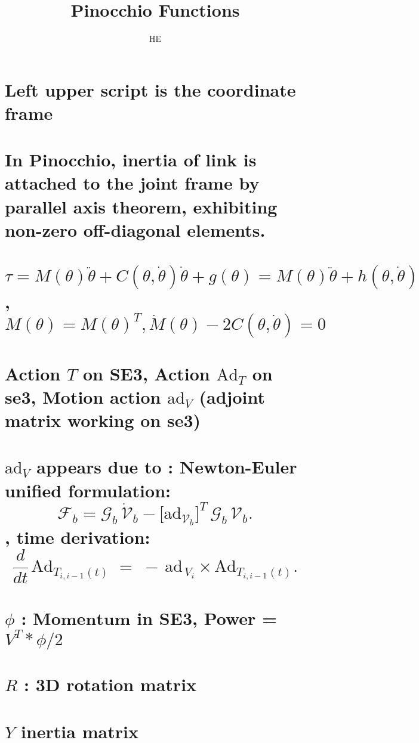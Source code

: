 \documentclass[10pt]{article}
\begin{document}
\title{Pinocchio Functions}
\author{HE}
\date{}
\maketitle

\section*{Left upper script is the coordinate frame}
\section*{In Pinocchio, inertia of link is attached to the joint frame by parallel axis theorem, exhibiting non-zero off-diagonal elements.}

\section*{$\tau = M(\theta) \ddot{\theta}+C(\theta,\dot{\theta})\dot{\theta} + g(\theta) = M(\theta) \ddot{\theta} + h(\theta,\dot{\theta})$
, $M(\theta) = M(\theta)^T, \dot{M}(\theta)-2C(\theta,\dot{\theta}) = 0$}


\section*{Action $T$ on SE3, 
Action  $\text{Ad}_T$ on se3, 
Motion action $\text{ad}_V$ (adjoint matrix working on se3)}
\section*{$\text{ad}_V$ appears due to : Newton-Euler unified formulation:
\[
\mathcal{F}_b 
= 
\mathcal{G}_b\,\dot{\mathcal{V}}_b
-
\bigl[\mathrm{ad}_{\mathcal{V}_b}\bigr]^{T}\,\mathcal{G}_b\,\mathcal{V}_b.
\]
, time derivation: \[
\frac{d}{dt} \,\mathrm{Ad}_{T_{i,i-1}(t)} 
\;=\;
-\,\mathrm{ad}_{\,V_{i}} \times \mathrm{Ad}_{T_{i,i-1}(t)}.
\]}
\section*{$\phi$ : $\boldsymbol{Momentum}$ in SE3, Power =  $V^T *\phi/2$}
\section*{$R$  : 3D rotation matrix}
\section*{$Y$ inertia matrix}
\end{document}

